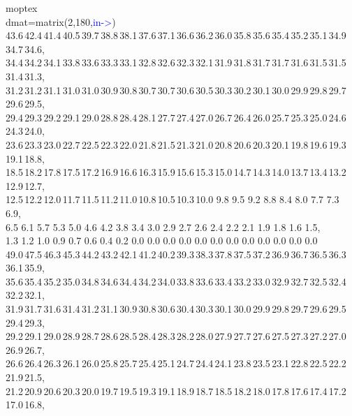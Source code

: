 \begin{example}[stemoptex]moptex\\ 
\label{stemoptex} 
\noindent dmat=\textcolor{VioletRed}{matrix}(2,180,\textcolor{blue}{in->})\\ 
43.6\,42.4\,41.4\,40.5\,39.7\,38.8\,38.1\,37.6\,37.1\,36.6\,36.2\,36.0\,35.8\,35.6\,35.4\,35.2\,35.1\,34.9\,34.7\,34.6,\\ 
34.4\,34.2\,34.1\,33.8\,33.6\,33.3\,33.1\,32.8\,32.6\,32.3\,32.1\,31.9\,31.8\,31.7\,31.7\,31.6\,31.5\,31.5\,31.4\,31.3,\\ 
31.2\,31.2\,31.1\,31.0\,31.0\,30.9\,30.8\,30.7\,30.7\,30.6\,30.5\,30.3\,30.2\,30.1\,30.0\,29.9\,29.8\,29.7\,29.6\,29.5,\\ 
29.4\,29.3\,29.2\,29.1\,29.0\,28.8\,28.4\,28.1\,27.7\,27.4\,27.0\,26.7\,26.4\,26.0\,25.7\,25.3\,25.0\,24.6\,24.3\,24.0,\\ 
23.6\,23.3\,23.0\,22.7\,22.5\,22.3\,22.0\,21.8\,21.5\,21.3\,21.0\,20.8\,20.6\,20.3\,20.1\,19.8\,19.6\,19.3\,19.1\,18.8,\\ 
18.5\,18.2\,17.8\,17.5\,17.2\,16.9\,16.6\,16.3\,15.9\,15.6\,15.3\,15.0\,14.7\,14.3\,14.0\,13.7\,13.4\,13.2\,12.9\,12.7,\\ 
12.5\,12.2\,12.0\,11.7\,11.5\,11.2\,11.0\,10.8\,10.5\,10.3\,10.0\,\,9.8\,\,9.5\,\,9.2\,\,8.8\,\,8.4\,\,8.0\,\,7.7\,\,7.3\,\,6.9,\\ 
6.5\,\,6.1\,\,5.7\,\,5.3\,\,5.0\,\,4.6\,\,4.2\,\,3.8\,\,3.4\,\,3.0\,\,2.9\,\,2.7\,\,2.6\,\,2.4\,\,2.2\,\,2.1\,\,1.9\,\,1.8\,\,1.6\,\,1.5,\\ 
1.3\,\,1.2\,\,1.0\,\,0.9\,\,0.7\,\,0.6\,\,0.4\,\,0.2\,\,0.0\,\,0.0\,\,0.0\,\,0.0\,\,0.0\,\,0.0\,\,0.0\,\,0.0\,\,0.0\,\,0.0\,\,0.0\,\,0.0\\ 
49.0\,47.5\,46.3\,45.3\,44.2\,43.2\,42.1\,41.2\,40.2\,39.3\,38.3\,37.8\,37.5\,37.2\,36.9\,36.7\,36.5\,36.3\,36.1\,35.9,\\ 
35.6\,35.4\,35.2\,35.0\,34.8\,34.6\,34.4\,34.2\,34.0\,33.8\,33.6\,33.4\,33.2\,33.0\,32.9\,32.7\,32.5\,32.4\,32.2\,32.1,\\ 
31.9\,31.7\,31.6\,31.4\,31.2\,31.1\,30.9\,30.8\,30.6\,30.4\,30.3\,30.1\,30.0\,29.9\,29.8\,29.7\,29.6\,29.5\,29.4\,29.3,\\ 
29.2\,29.1\,29.0\,28.9\,28.7\,28.6\,28.5\,28.4\,28.3\,28.2\,28.0\,27.9\,27.7\,27.6\,27.5\,27.3\,27.2\,27.0\,26.9\,26.7,\\ 
26.6\,26.4\,26.3\,26.1\,26.0\,25.8\,25.7\,25.4\,25.1\,24.7\,24.4\,24.1\,23.8\,23.5\,23.1\,22.8\,22.5\,22.2\,21.9\,21.5,\\ 
21.2\,20.9\,20.6\,20.3\,20.0\,19.7\,19.5\,19.3\,19.1\,18.9\,18.7\,18.5\,18.2\,18.0\,17.8\,17.6\,17.4\,17.2\,17.0\,16.8,\\ 

\end{example}
